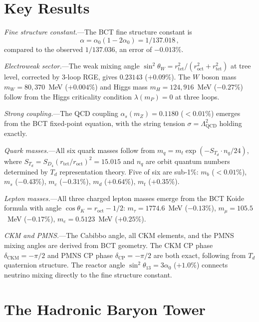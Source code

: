 \documentclass[aps,prl,reprint,superscriptaddress,showpacs]{revtex4-2}
\begin{document}
\section{Key Results}

\textit{Fine structure constant.}---The BCT fine structure constant is
\begin{equation}
  \alpha = \alpha_0(1 - 2\alpha_0) = 1/137.018\,,
  \label{eq:alpha}
\end{equation}
compared to the observed $1/137.036$, an error of $-0.013\%$.

\textit{Electroweak sector.}---The weak mixing angle
$\sin^2\theta_W = r_{\mathrm{tet}}^2/(r_{\mathrm{oct}}^2 + r_{\mathrm{tet}}^2)$
at tree level, corrected by 3-loop RGE, gives $0.23143$ ($+0.09\%$).
The $W$ boson mass $m_W = 80{,}370$~MeV ($+0.004\%$) and
Higgs mass $m_H = 124{,}916$~MeV ($-0.27\%$) follow from
the Higgs criticality condition $\lambda(m_P) = 0$ at three loops.

\textit{Strong coupling.}---The QCD coupling
$\alpha_s(m_Z) = 0.1180$ ($<0.01\%$) emerges from the BCT
fixed-point equation, with the string tension
$\sigma = \Lambda_{\mathrm{QCD}}^2$ holding exactly.

\textit{Quark masses.}---All six quark masses follow from
$m_q = m_t \exp(-S_{T_d} \cdot n_q/24)$,
where $S_{T_d} = S_{D_4}(r_{\mathrm{tet}}/r_{\mathrm{oct}})^2 = 15.015$
and $n_q$ are orbit quantum numbers determined by $T_d$ representation
theory. Five of six are sub-1\%: $m_b$ ($<0.01\%$), $m_s$ ($-0.43\%$),
$m_c$ ($-0.31\%$), $m_d$ ($+0.64\%$), $m_t$ ($+0.35\%$).

\textit{Lepton masses.}---All three charged lepton masses emerge from the
BCT Koide formula with angle
$\cos\theta_K = r_{\mathrm{oct}} - 1/2$:
$m_\tau = 1774.6$~MeV ($-0.13\%$),
$m_\mu = 105.5$~MeV ($-0.17\%$),
$m_e = 0.5123$~MeV ($+0.25\%$).

\textit{CKM and PMNS.}---The Cabibbo angle, all CKM elements,
and the PMNS mixing angles are derived from BCT geometry.
The CKM CP phase $\delta_{\mathrm{CKM}} = -\pi/2$ and
PMNS CP phase $\delta_{\mathrm{CP}} = -\pi/2$ are both exact,
following from $T_d$ quaternion structure.
The reactor angle $\sin^2\theta_{13} = 3\alpha_0$ ($+1.0\%$)
connects neutrino mixing directly to the fine structure constant.

\section{The Hadronic Baryon Tower}
\end{document}
